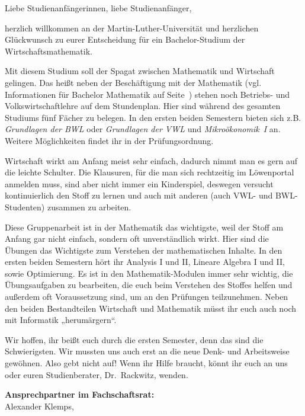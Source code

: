 Liebe Studienanfängerinnen, liebe Studienanfänger,\par

herzlich willkommen an der Martin-Luther-Universität und herzlichen Glückwunsch zu eurer Entscheidung für ein Bachelor-Studium der Wirtschaftsmathematik.

Mit diesem Studium soll der Spagat zwischen Mathematik und Wirtschaft gelingen.
Das heißt neben der Beschäftigung mit der Mathematik (vgl. Informationen für Bachelor Mathematik auf Seite~\pageref{studiengang_mathematik}) stehen noch Betriebs- und Volkswirtschaftlehre auf dem Stundenplan.
Hier sind während des gesamten Studiums fünf Fächer zu belegen.
In den ersten beiden Semestern bieten sich z.B. \textit{Grundlagen der BWL} oder \textit{Grundlagen der VWL} und \textit{Mikroökonomik~I} an.
Weitere Möglichkeiten findet ihr in der Prüfungsordnung.

Wirtschaft wirkt am Anfang meist sehr einfach, dadurch nimmt man es gern auf die leichte Schulter.
Die Klausuren, für die man sich rechtzeitig im Löwenportal anmelden muss, sind aber nicht immer ein Kinderspiel, deswegen versucht kontinuierlich den Stoff zu lernen und auch mit anderen (auch VWL- und BWL-Studenten) zusammen zu arbeiten.

Diese Gruppenarbeit ist in der Mathematik das wichtigste, weil der Stoff am Anfang gar nicht einfach, sondern oft unverständlich wirkt.
Hier sind die Übungen das Wichtigste zum Verstehen der mathematischen Inhalte.
In den ersten beiden Semestern hört ihr Analysis I und II, Lineare Algebra I und II, sowie Optimierung.
Es ist in den Mathematik-Modulen immer sehr wichtig, die Übungsaufgaben zu bearbeiten, die euch beim Verstehen des Stoffes helfen und außerdem oft Voraussetzung sind, um an den Prüfungen teilzunehmen.
Neben den beiden Bestandteilen Wirtschaft und Mathematik müsst ihr euch auch noch mit Informatik „herumärgern“.

Wir hoffen, ihr beißt euch durch die ersten Semester, denn das sind die Schwierigsten.
Wir mussten uns auch erst an die neue Denk- und Arbeitsweise gewöhnen.
Also gebt nicht auf!
Wenn ihr Hilfe braucht, könnt ihr euch an uns oder euren Studienberater, Dr.~Rackwitz, wenden.

\textbf{Ansprechpartner im Fachschaftsrat:}\\
Alexander Klemps, \\

\newpage


